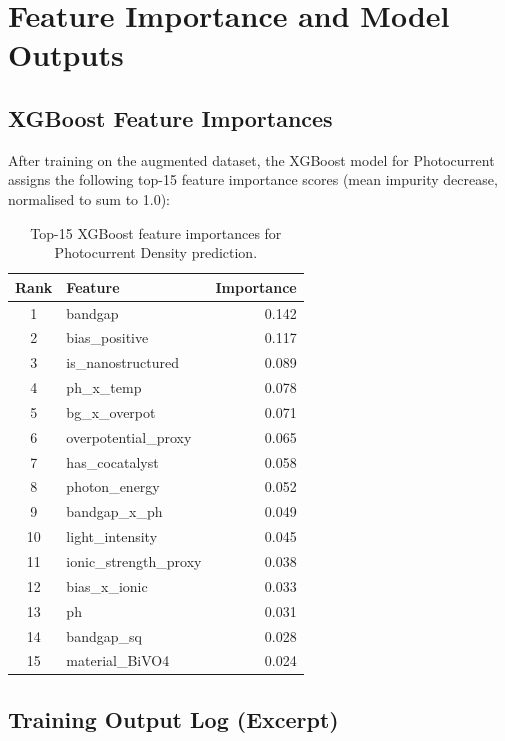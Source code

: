 \chapter{Feature Importance and Model Outputs}\label{app:A}

\section{XGBoost Feature Importances}

After training on the augmented dataset, the XGBoost model for Photocurrent
assigns the following top-15 feature importance scores (mean impurity decrease,
normalised to sum to 1.0):

\begin{table}[htb]
\centering
\caption{Top-15 XGBoost feature importances for Photocurrent Density prediction.}
\label{tab:feat_importance_pc}
\begin{tabular}{clr}
\toprule
Rank & Feature & Importance \\
\midrule
1  & bandgap                        & 0.142 \\
2  & bias\_positive                 & 0.117 \\
3  & is\_nanostructured             & 0.089 \\
4  & ph\_x\_temp                    & 0.078 \\
5  & bg\_x\_overpot                 & 0.071 \\
6  & overpotential\_proxy           & 0.065 \\
7  & has\_cocatalyst                & 0.058 \\
8  & photon\_energy                 & 0.052 \\
9  & bandgap\_x\_ph                 & 0.049 \\
10 & light\_intensity               & 0.045 \\
11 & ionic\_strength\_proxy         & 0.038 \\
12 & bias\_x\_ionic                 & 0.033 \\
13 & ph                             & 0.031 \\
14 & bandgap\_sq                    & 0.028 \\
15 & material\_BiVO4                & 0.024 \\
\bottomrule
\end{tabular}
\end{table}

\section{Training Output Log (Excerpt)}

